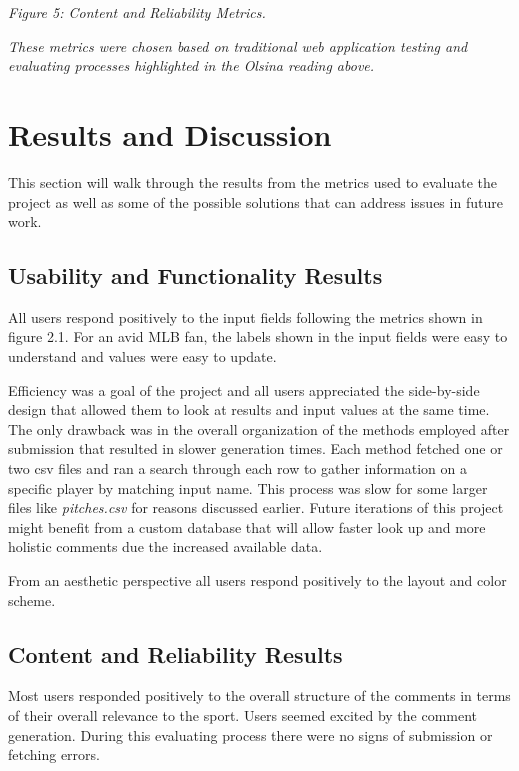 \documentclass[10pt,twocolumn]{article}
\begin{document}
\textit{Figure 5: Content and Reliability Metrics.}
\break

\textit{These metrics were chosen based on traditional web application testing and evaluating processes highlighted in the Olsina reading above. }

\section{Results and Discussion}

This section will walk through the results from the metrics used to evaluate the project as well as some of the possible solutions that can address issues in future work. 

\subsection{Usability and Functionality Results}

All users respond positively to the input fields following the metrics shown in figure 2.1. For an avid MLB fan, the labels shown in the input fields were easy to understand and values were easy to update.

Efficiency was a goal of the project and all users appreciated the side-by-side design that allowed them to look at results and input values at the same time. The only drawback was in the overall organization of the methods employed after submission that resulted in slower generation times. Each method fetched one or two csv files and ran a search through each row to gather information on a specific player by matching input name. This process was slow for some larger files like \textit{pitches.csv} for reasons discussed earlier. Future iterations of this project might benefit from a custom database that will allow faster look up and more holistic comments due the increased available data.

From an aesthetic perspective all users respond positively to the layout and color scheme.

\subsection{Content and Reliability Results}

Most users responded positively to the overall structure of the comments in terms of their overall relevance to the sport. Users seemed excited by the comment generation. During this evaluating process there were no signs of submission or fetching errors. 
\end{document}
